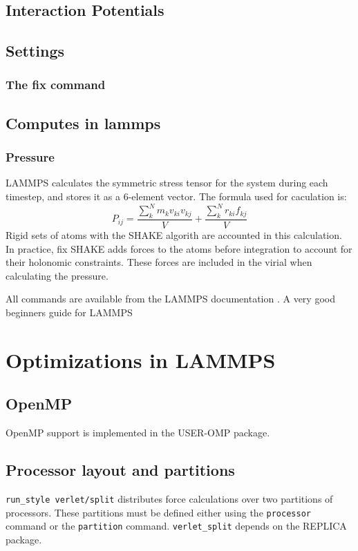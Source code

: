 \subsection{Interaction Potentials}

\subsection{Settings}
\subsubsection{The fix command}

\subsection{Computes in lammps}
\subsubsection{Pressure}
LAMMPS calculates the symmetric stress tensor for the system during each timestep, and stores it as a 6-element vector. The formula used for caculation is:
\begin{equation}
	P_{ij} = \frac{\sum_k^N  m_k v_{ki} v_{kj}}{V} + \frac{\sum_k^N r_{ki} f_{kj}}{V}
\end{equation}
Rigid sets of atoms with the SHAKE algorith are accounted in this calculation. In practice, fix SHAKE adds forces to the atoms before integration to account for their holonomic constraints. These forces are included in the virial when calculating the pressure. 


All commands are available from the LAMMPS documentation \cite{lammps:input_commands}. A very good beginners guide for LAMMPS \cite{lammps:guide:pittsburg}

\section{Optimizations in LAMMPS}
\subsection{OpenMP}
OpenMP support is implemented in the USER-OMP package. 
\subsection{Processor layout and partitions}
{\tt run\_style verlet/split} distributes force calculations over two partitions of processors. These partitions must be defined either using the {\tt processor} command or the {\tt partition} command. {\tt verlet\_split} depends on the REPLICA package. 


